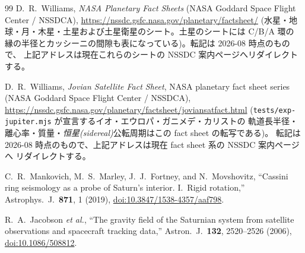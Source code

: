 \documentclass[a4paper,10pt,twocolumn]{ltjsarticle}
\begin{document}
\begin{thebibliography}{99}
D.~R.~Williams, \emph{NASA Planetary Fact Sheets} (NASA Goddard Space
Flight Center / NSSDCA),
\href{https://nssdc.gsfc.nasa.gov/planetary/factsheet/}
{https://nssdc.gsfc.nasa.gov/planetary/factsheet/}
(水星・地球・月・木星・土星および土星衛星のシート。土星のシートには C/B/A 環の
縁の半径とカッシーニの間隙も表になっている)。転記は 2026-08 時点のもので、
上記アドレスは現在これらのシートの NSSDC 案内ページへリダイレクトする。

D.~R.~Williams, \emph{Jovian Satellite Fact Sheet}, NASA planetary
fact sheet series (NASA Goddard Space Flight Center / NSSDCA),
\url{https://nssdc.gsfc.nasa.gov/planetary/factsheet/joviansatfact.html}
(\texttt{tests/exp-jupiter.mjs} が宣言するイオ・エウロパ・ガニメデ・カリストの
軌道長半径・離心率・質量・\emph{恒星(sidereal)}公転周期はこの fact sheet の転写である)。
転記は 2026-08 時点のもので、上記アドレスは現在 fact sheet 系の NSSDC 案内ページへ
リダイレクトする。

C.~R.~Mankovich, M.~S.~Marley, J.~J.~Fortney, and N.~Movshovitz,
``Cassini ring seismology as a probe of Saturn's interior.
I.\ Rigid rotation,'' Astrophys.\ J.\ \textbf{871}, 1 (2019),
\href{https://doi.org/10.3847/1538-4357/aaf798}
{doi:10.3847/1538-4357/aaf798}.

R.~A.~Jacobson \emph{et al.}, ``The gravity field of the Saturnian
system from satellite observations and spacecraft tracking data,''
Astron.\ J.\ \textbf{132}, 2520--2526 (2006),
\href{https://doi.org/10.1086/508812}{doi:10.1086/508812}.


\end{thebibliography}
\end{document}
